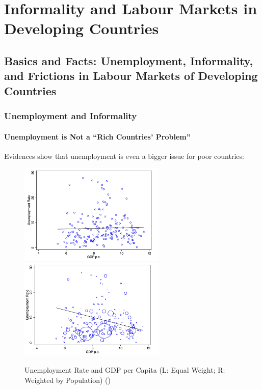 \chapter{Informality and Labour Markets in Developing Countries}


\section{Basics and Facts: Unemployment, Informality, and Frictions in Labour Markets of Developing Countries}

    \subsection{Unemployment and Informality}
    
        \subsubsection{Unemployment is Not a ``Rich Countries' Problem''}
            Evidences show that unemployment is even a bigger issue for poor countries:
            \begin{figure}[H]
                \centering
                \includegraphics[width=2.75in]{images/ch6/unemp_gdp_1.png}
                \includegraphics[width=2.75in]{images/ch6/unemp_gdp_2.png}
                \caption{Unemployment Rate and GDP per Capita (L: Equal Weight; R: Weighted by Population) (\cite{the_world_bank_world_2022})}
            \end{figure}
            
